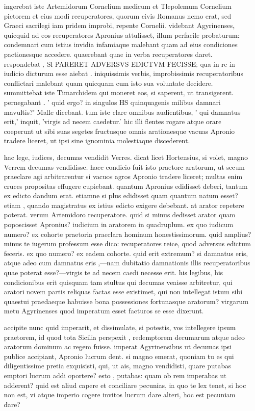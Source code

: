 ingerebat iste Artemidorum Cornelium medicum et Tlepolemum Cornelium pictorem et eius modi recuperatores, quorum civis Romanus nemo erat, sed Graeci sacrilegi iam pridem improbi, repente Cornelii. videbant Agyrinenses, quicquid ad eos recuperatores Apronius attulisset, illum perfacile probaturum: condemnari cum istius invidia infamiaque malebant quam ad eius condiciones pactionesque accedere. quaerebant quae in verba recuperatores daret. respondebat , Sl PARERET ADVERSVS EDICTVM FECISSE; qua in re in iudicio dicturum esse aiebat . iniquissimis verbis, improbissimis recuperatoribus conflictari malebant quam quicquam cum isto sua voluntate decidere. summittebat iste Timarchidem qui moneret eos, si saperent, ut transigerent. pernegabant . ' quid ergo? in singulos HS quinquagenis milibus damnari mavultis?' Malle dicebant. tum iste clare omnibus audientibus, ' qui damnatus erit,' inquit, 'virgis ad necem caedetur.' hic illi flentes rogare atque orare coeperunt ut sibi suas segetes fructusque omnis arationesque vacuas Apronio tradere liceret, ut ipsi sine ignominia molestiaque discederent.

 hac lege, iudices, decumas vendidit Verres. dicat licet Hortensius, si volet, magno Verrem decumas vendidisse. haec condicio fuit isto praetore aratorum, ut secum praeclare agi arbitrarentur si vacuos agros Apronio tradere liceret; multas enim cruces propositas effugere cupiebant. quantum Apronius edidisset deberi, tantum ex edicto dandum erat. etiamne si plus edidisset quam quantum natum esset? etiam , quando magistratus ex istius edicto exigere debebant. at arator repetere poterat. verum Artemidoro recuperatore. quid si minus dedisset arator quam poposcisset Apronius? iudicium in aratorem in quadruplum. ex quo iudicum numero? ex cohorte praetoria praeclara hominum honestissimorum. quid amplius? minus te iugerum professum esse dico: recuperatores reice, quod adversus edictum feceris. ex quo numero? ex eadem cohorte. quid erit extremum? si damnatus eris, atque adeo cum damnatus eris ,—nam dubitatio damnationis illis recuperatoribus quae poterat esse?—virgis te ad necem caedi necesse erit. his legibus, his condicionibus erit quisquam tam stultus qui decumas venisse arbitretur, qui aratori novem partis reliquas factas esse existimet, qui non intellegat istum sibi quaestui praedaeque habuisse bona possessiones fortunasque aratorum? virgarum metu Agyrinenses quod imperatum esset facturos se esse dixerunt.

 accipite nunc quid imperarit, et dissimulate, si potestis, vos intellegere ipsum praetorem, id quod tota Sicilia perspexit , redemptorem decumarum atque adeo aratorum dominum ac regem fuisse. imperat Agyrinensibus ut decumas ipsi publice accipiant, Apronio lucrum dent. si magno emerat, quoniam tu es qui diligentissime pretia exquisisti, qui, ut ais, magno vendidisti, quare putabas emptori lucrum addi oportere? esto , putabas: quam ob rem imperabas ut adderent? quid est aliud capere et conciliare pecunias, in quo te lex tenet, si hoc non est, vi atque imperio cogere invitos lucrum dare alteri, hoc est pecuniam dare?

